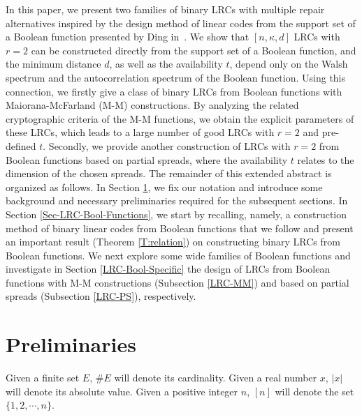 \documentclass[10pt]{article}
\newcommand{\0}{\textbf{0}}
\newcommand{\1}{\textbf{1}}
\begin{document}
In this paper, we present two families of binary LRCs with multiple repair alternatives inspired by the design method of linear codes from the support set of a Boolean function presented by Ding in~\cite{DingIT2015,DingDM16}. We show that $[n,\kappa,d]$ LRCs with $r=2$ can be constructed directly from the support set of a Boolean function, and the minimum distance $d$, as well as the availability $t$, depend only on the Walsh spectrum and the autocorrelation spectrum of the Boolean function. Using this connection, we firstly give a class of binary LRCs from Boolean functions with Maiorana-McFarland (M-M) constructions.
By analyzing the related cryptographic criteria of the M-M functions, we obtain the explicit parameters of these LRCs,
which leads to a large number of good LRCs with $r=2$ and pre-defined $t$.
Secondly, we provide another construction of LRCs with $r=2$ from Boolean functions based on partial spreads,
where the availability $t$ relates to the dimension of the chosen spreads. The remainder of this extended abstract is organized as follows.
In Section \ref{Sec-Preliminaries}, we fix our notation and introduce some background and necessary
preliminaries required for the subsequent sections. In Section \ref{Sec-LRC-Bool-Functions}, we start by recalling, namely, a construction method of binary linear codes from Boolean functions that we follow and present an important result (Theorem \ref{T:relation}) on constructing binary LRCs from Boolean functions. We next explore some wide families of Boolean functions and investigate in Section \ref{LRC-Bool-Specific} the design of LRCs from Boolean functions with M-M constructions (Subsection \ref{LRC-MM}) and based on partial spreads (Subsection \ref{LRC-PS}), respectively.


\section{Preliminaries}\label{Sec-Preliminaries}
Given a finite set $E$, $\# E$ will denote its cardinality. Given a real number $x$,  $|x|$ will denote its  absolute value.
Given a positive integer $n$, $[n]$ will denote the set $\{1,2,\cdots, n\}$.
\end{document}
